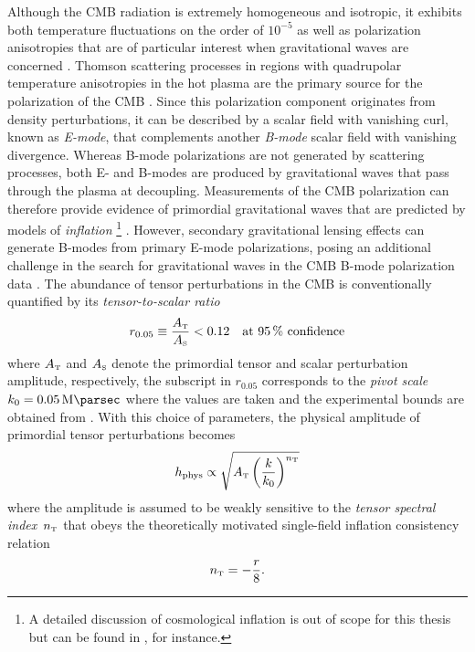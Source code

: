 \documentclass[12pt,parskip=half]{scrreprt}
\begin{document}
Although the CMB radiation is extremely homogeneous and isotropic, it exhibits both temperature fluctuations on the order of \(10^{-5}\) as well as polarization an\-iso\-tro\-pies that are of particular interest when gravitational waves are concerned \autocite{Hu2008,Challinor2012}. Thomson scattering processes in regions with quadrupolar temperature anisotropies in the hot plasma are the primary source for the polarization of the CMB \autocite{Hu2008}. Since this polarization component originates from density perturbations, it can be described by a scalar field with vanishing curl, known as \emph{E-mode}, that complements another \emph{B-mode} scalar field with vanishing divergence. Whereas B-mode polarizations are not generated by scattering processes, both E- and B-modes are produced by gravitational waves that pass through the plasma at decoupling. Measurements of the CMB polarization can therefore provide evidence of primordial gravitational waves that are predicted by models of \emph{inflation} \footnote{A detailed discussion of cosmological inflation is out of scope for this thesis but can be found in \textcite{TASI2009}, for instance.} \autocite{Starobinsky1979,Abbott1984}. However, secondary gravitational lensing effects can generate B-modes from primary E-mode polarizations, posing an additional challenge in the search for gravitational waves in the CMB B-mode polarization data \autocite{Challinor2012}. The abundance of tensor perturbations in the CMB is conventionally quantified by its \emph{tensor-to-scalar ratio}
\begin{equation}\label{eq:tens_scal_ratio}
	r_{0.05} \equiv \frac{A_{\textnormal{\tiny{T}}}}{A_{\textnormal{\tiny{S}}}} < 0.12 \quad \text{at \SI{95}{\percent} confidence}
\end{equation}
where \(A_{\textnormal{\tiny{T}}}\) and \(A_{\textnormal{\tiny{S}}}\) denote the primordial tensor and scalar perturbation amplitude, respectively, the subscript in \(r_{0.05}\) corresponds to the \emph{pivot scale} \(k_0 = \SI{0.05}{\per\mega\parsec}\) where the values are taken and the experimental bounds are obtained from \textcite{BKP2015}. With this choice of parameters, the physical amplitude of primordial tensor perturbations becomes
\begin{equation}\label{eq:phys_ampl}
	h_\textnormal{phys} \propto \sqrt{A_\tenspert\del{\frac{k}{k_0}}^{n_\tenspert}}
\end{equation}
where the amplitude is assumed to be weakly sensitive to the \emph{tensor spectral index}~\(n_{\textnormal{\tiny{T}}}\) that obeys the theoretically motivated single-field inflation consistency relation \autocite{Planck2015Data}
\begin{equation}
	n_{\textnormal{\tiny{T}}} = -\frac{r}{8}
	\mathpunct{.}
\end{equation}
\end{document}
